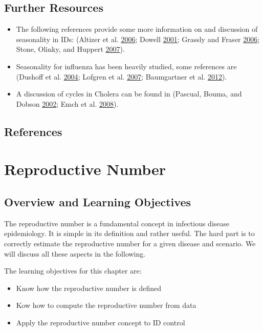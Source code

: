 \documentclass[]{article}
\providecommand{\tightlist}{%
  \setlength{\itemsep}{0pt}\setlength{\parskip}{0pt}}
\theoremstyle{definition}
\theoremstyle{definition}
\theoremstyle{definition}
\theoremstyle{remark}
\begin{document}
\subsection{Further Resources}\label{further-resources-2}

\begin{itemize}
\tightlist
\item
  The following references provide some more information on and
  discussion of seasonality in IDs: (Altizer et al.
  \protect\hyperlink{ref-altizer06}{2006}; Dowell
  \protect\hyperlink{ref-dowell01}{2001}; Grassly and Fraser
  \protect\hyperlink{ref-grassly06}{2006}; Stone, Olinky, and Huppert
  \protect\hyperlink{ref-stone07}{2007}).
\item
  Seasonality for influenza has been heavily studied, some references
  are (Dushoff et al. \protect\hyperlink{ref-dushoff04}{2004}; Lofgren
  et al. \protect\hyperlink{ref-lofgren07}{2007}; Baumgartner et al.
  \protect\hyperlink{ref-baumgartner12}{2012}).
\item
  A discussion of cycles in Cholera can be found in (Pascual, Bouma, and
  Dobson \protect\hyperlink{ref-pascual02}{2002}; Emch et al.
  \protect\hyperlink{ref-emch08}{2008}).
\end{itemize}

\subsection{References}\label{references-3}

\section{Reproductive Number}\label{reproductive-number}

\subsection{Overview and Learning
Objectives}\label{overview-and-learning-objectives-3}

The reproductive number is a fundamental concept in infectious disease
epidemiology. It is simple in its definition and rather useful. The hard
part is to correctly estimate the reproductive number for a given
disease and scenario. We will discuss all these aspects in the
following.

The learning objectives for this chapter are:

\begin{itemize}
\tightlist
\item
  Know how the reproductive number is defined
\item
  Kow how to compute the reproductive number from data
\item
  Apply the reproductive number concept to ID control
\end{itemize}
\end{document}

